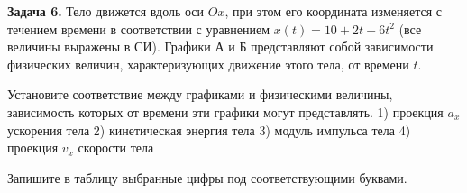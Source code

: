 
\begin{taskbasic}[code={\label{task:dem26_v20_n6}}]
\textbf{Задача 6.} Тело движется вдоль оси $Ox$, при этом его координата изменяется с течением времени в соответствии с уравнением $x(t)=10+2t-6t^{2}$ (все величины выражены в СИ). Графики А и Б представляют собой зависимости физических величин, характеризующих движение этого тела, от времени $t$.

\nopagebreak\smallskip
\begin{center}
\begin{minipage}[b]{0.45\linewidth}
\centering
{}
\end{minipage}
\begin{minipage}[b]{0.45\linewidth}
\centering
{}
\end{minipage}
\end{center}

Установите соответствие между графиками и физическими величины, зависимость которых от времени эти графики могут представлять.
1) проекция $a_x$ ускорения тела
2) кинетическая энергия тела
3) модуль импульса тела
4) проекция $v_x$ скорости тела

Запишите в таблицу выбранные цифры под соответствующими буквами.

\end{taskbasic}


